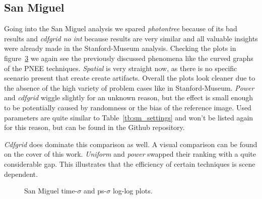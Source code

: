 \subsection{San Miguel}
Going into the San Miguel analysis we spared \textit{photontree} because of its bad results and \textit{cdfgrid no int} because results are very similar and all valuable insights were already made in the Stanford-Museum analysis. Checking the plots in figure~\ref{fig:sanmain} we again see the previously discussed phenomena like the curved graphs of the PNEE techniques. \textit{Spatial} is very straight now, as there is no specific scenario present that create create artifacts. Overall the plots look cleaner due to the absence of the high variety of problem cases like in Stanford-Museum. \textit{Power} and \textit{cdfgrid} wiggle slightly for an unknown reason, but the effect is small enough to be potentially caused by randomness or the bias of the reference image. Used parameters are quite similar to Table~\ref{tb:sm_settings} and won't be listed again for this reason, but can be found in the Github repository.

\textit{Cdfgrid} does dominate this comparison as well. A visual comparison can be found on the cover of this work. \textit{Uniform} and \textit{power} swapped their ranking with a quite considerable gap. This illustrates that the efficiency of certain techniques is scene dependent. 



\begin{figure}
    \centering
    \begin{subfigure}{.5\textwidth}
      \centering
        \caption{}
        \label{fig:sanmain_t}
    \end{subfigure}%
    \begin{subfigure}{.5\textwidth}
        \caption{}
        \label{fig:sanmain_ps}
    \end{subfigure}
    \caption{San Miguel time-$\sigma$ and ps-$\sigma$ log-log plots.}
    \label{fig:sanmain}
\end{figure}

